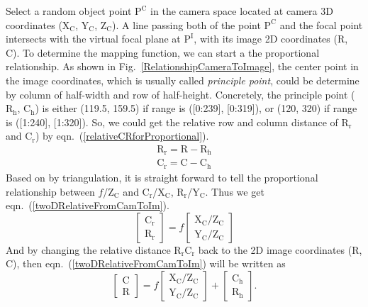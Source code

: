 Select a random object point \(\text{P}^\text{C}\) in the camera space located at camera 3D coordinates (\(\text{X}_\text{C}\), \(\text{Y}_\text{C}\), \(\text{Z}_\text{C}\)). A line passing both of the point \(\text{P}^\text{C}\) and the focal point intersects with the virtual focal plane at \(\text{P}^\text{I}\), with its image 2D coordinates (R, C). To determine the mapping function, we can start a the proportional relationship. As shown in Fig.~\ref{RelationshipCameraToImage}, the center point in the image coordinates, which is usually called \emph{principle point}, could be determine by column of half-width and row of half-height. Concretely, the principle point (\(\text{R}_\text{h}\), \(\text{C}_\text{h}\)) is either (119.5, 159.5) if range is ([0:239], [0:319]), or (120, 320) if range is ([1:240], [1:320]). So, we could get the relative row and column distance of  \(\text{R}_\text{r}\) and \(\text{C}_\text{r}\)) by eqn.~(\ref{relativeCRforProportional}).
%
\begin{equation}
\begin{aligned}
\text{R}_\text{r} = \text{R} - \text{R}_\text{h}%
\\%
\text{C}_\text{r} = \text{C} - \text{C}_\text{h}%
\end{aligned}
\label{relativeCRforProportional}
\end{equation}%
%
Based on by triangulation, it is straight forward to tell the proportional relationship between \(f\)/\(\text{Z}_\text{C}\) and \(\text{C}_\text{r}\)/\(\text{X}_\text{C}\), \(\text{R}_\text{r}\)/\(\text{Y}_\text{C}\). Thus we get eqn.~(\ref{twoDRelativeFromCamToIm}).
%
\begin{equation}
\left[ \begin{array}{c} \text{C}_\text{r} \\ \text{R}_\text{r} \end{array} \right] %
= f %
\left[ \begin{array}{c} \text{X}_\text{C}/\text{Z}_\text{C} \\ \text{Y}_\text{C}/\text{Z}_\text{C} \end{array} \right]%
\label{twoDRelativeFromCamToIm}
\end{equation}
\noindent
And by changing the relative distance \(\text{R}_\text{r}\text{C}_\text{r}\) back to the 2D image coordinates (R, C), then eqn.~(\ref{twoDRelativeFromCamToIm}) will be written as
%
\begin{equation}
\left[ \begin{array}{c} \text{C} \\ \text{R} \end{array} \right] %
= f %
\left[ \begin{array}{c} \text{X}_\text{C}/\text{Z}_\text{C} \\ \text{Y}_\text{C}/\text{Z}_\text{C} \end{array} \right]%
+
\left[ \begin{array}{c}  \text{C}_\text{h} \\  \text{R}_\text{h} \end{array} \right] .%
\label{linearRelationFromCamToIm}
\end{equation}
